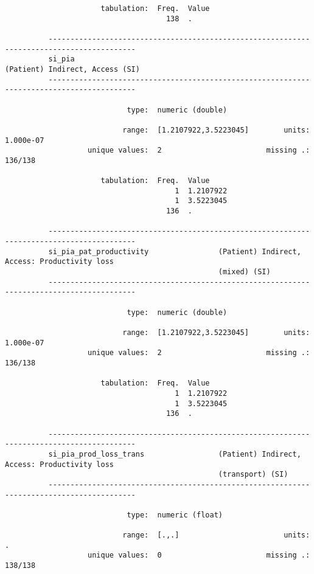 \documentclass{article}
\begin{document}
\begin{verbatim}
                      tabulation:  Freq.  Value
                                     138  .
          
          ------------------------------------------------------------------------------------------
          si_pia                                                     (Patient) Indirect, Access (SI)
          ------------------------------------------------------------------------------------------
          
                            type:  numeric (double)
          
                           range:  [1.2107922,3.5223045]        units:  1.000e-07
                   unique values:  2                        missing .:  136/138
          
                      tabulation:  Freq.  Value
                                       1  1.2107922
                                       1  3.5223045
                                     136  .
          
          ------------------------------------------------------------------------------------------
          si_pia_pat_productivity                (Patient) Indirect, Access: Productivity loss
                                                 (mixed) (SI)
          ------------------------------------------------------------------------------------------
          
                            type:  numeric (double)
          
                           range:  [1.2107922,3.5223045]        units:  1.000e-07
                   unique values:  2                        missing .:  136/138
          
                      tabulation:  Freq.  Value
                                       1  1.2107922
                                       1  3.5223045
                                     136  .
          
          ------------------------------------------------------------------------------------------
          si_pia_prod_loss_trans                 (Patient) Indirect, Access: Productivity loss
                                                 (transport) (SI)
          ------------------------------------------------------------------------------------------
          
                            type:  numeric (float)
          
                           range:  [.,.]                        units:  .
                   unique values:  0                        missing .:  138/138
          

\end{verbatim}
\end{document}
